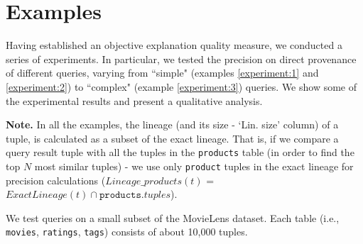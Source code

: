 \section{Examples}\label{sec:initial-experimentation}

Having established an objective explanation quality measure, we conducted a series of experiments. In particular, we tested the precision on direct provenance of different queries, varying from ``simple" (examples \ref{experiment:1} and \ref{experiment:2}) to ``complex" (example \ref{experiment:3}) queries. We show some of the experimental results and present a qualitative analysis.
\par\textbf{Note.} In all the examples, the lineage (and its size - `Lin. size' column) of a tuple, is calculated as a subset of the exact lineage. That is, if we compare a query result tuple with all the tuples in the \texttt{products} table (in order to find the top $N$ most similar tuples) - we use only \texttt{product} tuples in the exact lineage for precision calculations ($Lineage\_products(t)$ = $ExactLineage(t) \cap \texttt{products}.tuples$).


\begin{runexample}
We test queries on a small subset of the MovieLens dataset. Each table (i.e., \texttt{movies}, \texttt{ratings}, \texttt{tags}) consists of about 10,000 tuples.
\end{runexample}


